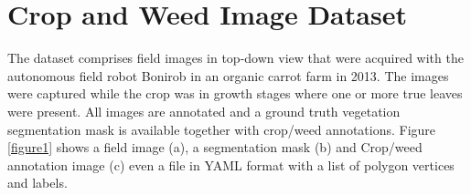 \documentclass[12pt]{article}
\numberwithin{equation}{section}
\numberwithin{table}{section}
\numberwithin{figure}{section}
\begin{document}
%
%




%
%
%



\section{Crop and Weed Image Dataset}

The dataset \cite{haug15} comprises field images in top-down view that were acquired with the autonomous field robot Bonirob\cite{BOSH} in an organic carrot farm in 2013. The images were captured while the crop was in growth stages where one or more true leaves were present. All images are annotated and a ground truth vegetation segmentation mask is available together with crop/weed annotations. Figure \ref{figure1} shows a field image (a), a segmentation mask (b) and Crop/weed annotation image (c) even a file in YAML format with a list of polygon vertices and labels.
\end{document}
